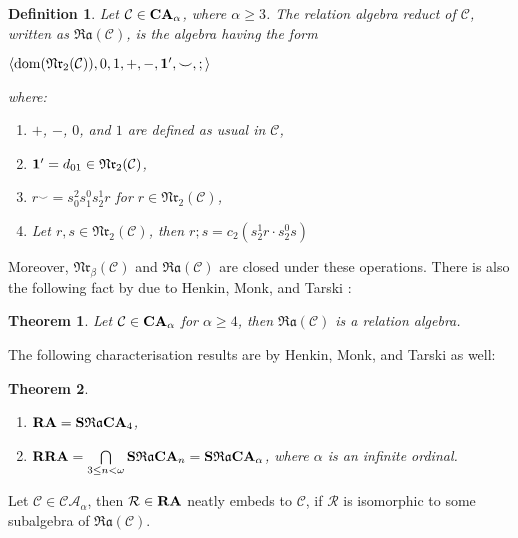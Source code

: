 \documentclass[a4paper]{article}
\theoremstyle{defin}
\newtheorem{defin}{Definition}
\theoremstyle{theorem}
\newtheorem{theorem}{Theorem}
\theoremstyle{prop}
\theoremstyle{lemma}
\theoremstyle{fact}
\theoremstyle{ex}
\theoremstyle{col}
\begin{document}
\begin{defin}
  Let $\mathcal{C} \in {\bf CA}_{\alpha}$, where $\alpha \geq 3$. The relation algebra reduct of $\mathcal{C}$, written as $\mathfrak{Ra}(\mathcal{C})$, is the algebra having the form

  \begin{center}
    $\langle \operatorname{dom}(\mathfrak{Nr}_2(\mathcal{C})), 0, 1, +, -, {\bf 1}', \smile, ; \rangle$
  \end{center}
  where:

  \begin{enumerate}
    \item $+$, $-$, $0$, and $1$ are defined as usual in $\mathcal{C}$,
    \item ${\bf 1}' = d_{01} \in \mathfrak{Nr}_2(\mathcal{C})$,
    \item $r^{\smile} = s^{2}_{0} s^{0}_{1} s^{1}_{2} r$ for $r \in \mathfrak{Nr}_2(\mathcal{C})$,
    \item Let $r, s \in \mathfrak{Nr}_2(\mathcal{C})$, then $r ; s = c_2 (s^{1}_{2}r \cdot s^{0}_{2}s)$
  \end{enumerate}
\end{defin}

Moreover, $\mathfrak{Nr}_{\beta}(\mathcal{C})$ and $\mathfrak{Ra}(\mathcal{C})$ are closed under these operations.
There is also the following fact by due to Henkin, Monk, and Tarski \cite{Henkin1988-HENCAP-4}:
\begin{theorem}
  Let $\mathcal{C} \in {\bf CA}_{\alpha}$ for $\alpha \geq 4$, then $\mathfrak{Ra}(\mathcal{C})$ is a relation algebra.
\end{theorem}

The following characterisation results are by Henkin, Monk, and Tarski \cite[5.3.13, 5.3.16]{Henkin1988-HENCAP-4} as well:
\begin{theorem} \label{char}
  $ $

  \begin{enumerate}
    \item ${\bf RA} = {\bf S} \mathfrak{Ra} {\bf CA}_4$,
    \item ${\bf RRA} = \bigcap \limits_{3 \leq n < \omega} {\bf S} \mathfrak{Ra} {\bf CA}_n =  {\bf S} \mathfrak{Ra} {\bf CA}_{\alpha}$, where $\alpha$ is an infinite ordinal.
  \end{enumerate}
\end{theorem}


Let $\mathcal{C} \in \mathcal{CA}_{\alpha}$, then $\mathcal{R} \in {\bf RA}$ neatly embeds to $\mathcal{C}$, if $\mathcal{R}$ is isomorphic to some subalgebra of $\mathfrak{Ra}(\mathcal{C})$.
\end{document}
